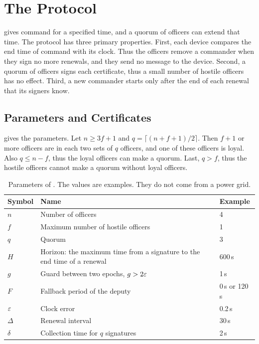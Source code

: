 \section{The \sys{} Protocol}
\label{sec:protocol}

\sys{} gives command for a specified time, and a quorum of officers can extend that time.
The protocol has three primary properties. First, each device compares the end time of
command with its clock. Thus the officers remove a commander when they sign no more
renewals, and they send no message to the device. Second, a quorum of officers signs each
certificate, thus a small number of hostile officers has no effect. Third, a new commander
starts only after the end of each renewal that its signers know.

\subsection{Parameters and Certificates}

 gives the parameters. Let $n \ge 3f + 1$ and
$q = \lceil (n + f + 1)/2 \rceil$. Then $f + 1$ or more officers are in each two sets of
$q$ officers, and one of these officers is loyal. Also $q \le n - f$, thus the loyal
officers can make a quorum. Last, $q > f$, thus the hostile officers cannot make a quorum
without loyal officers.

\begin{table}[t]
\caption{Parameters of \sys{}. The values are examples. They do not come from a power grid.}
\label{tab:params}
\centering
\small
\begin{tabularx}{\columnwidth}{@{}l>{\raggedright\arraybackslash}Xl@{}}
\toprule
Symbol & Name & Example \\
\midrule
$n$ & Number of officers & 4 \\
$f$ & Maximum number of hostile officers & 1 \\
$q$ & Quorum & 3 \\
$H$ & Horizon: the maximum time from a signature to the end time of a renewal & 600\,s \\
$g$ & Guard between two epochs, $g > 2\varepsilon$ & 1\,s \\
$F$ & Fallback period of the deputy & 0\,s or 120\,s \\
$\varepsilon$ & Clock error & 0.2\,s \\
$\Delta$ & Renewal interval & 30\,s \\
$\delta$ & Collection time for $q$ signatures & 2\,s \\
\bottomrule
\end{tabularx}
\end{table}

